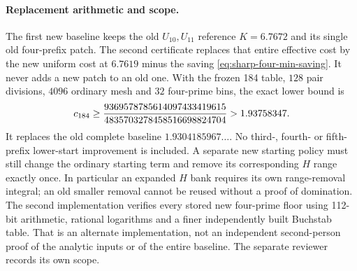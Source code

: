 \paragraph{Replacement arithmetic and scope.}
The first new baseline keeps the old $U_{10},U_{11}$ reference
$K=6.7672$ and its single old four-prefix patch.  The second certificate
replaces that entire effective cost by the new uniform cost at $6.7619$
minus the saving \eqref{eq:sharp-four-min-saving}.  It never adds a new
patch to an old one.  With the frozen 184 table, $128$ pair divisions,
$4096$ ordinary mesh and $32$ four-prime bins, the exact lower bound is
\begin{equation}\label{eq:sharp-184-baseline-value}
 c_{184}\ge
 {9369578785614097433419615\over4835703278458516698824704}
 >1.93758347.
\end{equation}
It replaces the old complete baseline $1.9304185967\ldots$.
No third-, fourth- or fifth-prefix lower-start improvement is included.
A separate new starting policy must still change the ordinary starting
term and remove its corresponding $H$ range exactly once.  In particular
an expanded $H$ bank requires its own range-removal integral; an old
smaller removal cannot be reused without a proof of domination.
The second implementation verifies every stored new four-prime floor
using 112-bit arithmetic, rational logarithms and a finer independently
built Buchstab table.  That is an alternate implementation, not an
independent second-person proof of the analytic inputs or of the entire
baseline.  The separate reviewer records its own scope.
